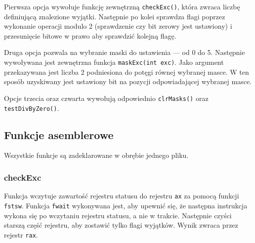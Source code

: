 \documentclass[polish, 11pt]{article}
\begin{document}
			Pierwsza opcja wywołuje funkcję zewnętrzną \verb|checkExc()|,
			która zwraca liczbę definiującą znalezione wyjątki.
			Następnie po kolei sprawdza flagi poprzez wykonanie operacji modulo 2 (sprawdzenie czy bit zerowy jest ustawiony)
			i przesunięcie bitowe w prawo aby sprawdzić kolejną flagę.

			Druga opcja pozwala na wybranie maski do ustawienia --- od 0 do 5.
			Następnie wywoływana jest zewnętrzna funkcja \verb|maskExc(int exc)|.
			Jako argument przekazywana jest liczba 2 podniesiona do potęgi równej wybranej masce.
			W ten sposób uzyskiwany jest ustawiony bit na pozycji odpowiadającej wybranej masce.

			Opcje trzecia oraz czwarta wywołują odpowiednio \verb|clrMasks()| oraz \verb|testDivByZero()|.
			
			

	\subsection{Funkcje asemblerowe}	
		\begin{minipage}{.5\textwidth}
			Wszystkie funkcje są zadeklarowane w obrębie jednego pliku.
		\end{minipage}%
		\hspace{1cm}
		\begin{minipage}{.5\textwidth}
			
		\end{minipage}

		\subsubsection{checkExc}
			\begin{minipage}{.5\textwidth}
				Funkcja wczytuje zawartość rejestru statusu do rejestru \verb|ax|
				za pomocą funkcji \verb|fstsw|.
				Funkcja \verb|fwait| wykonywana jest, aby upewnić się,
				że następna instrukcja wykona się po wczytaniu rejestru statusu, a nie w trakcie.
				Następnie czyści starszą część rejestru, aby zostawić tylko flagi wyjątków.
				Wynik zwraca przez rejestr \verb|rax|.
			\end{minipage}%
			\hspace{1cm}
			\begin{minipage}{.5\textwidth}
				
			\end{minipage}
\end{document}
